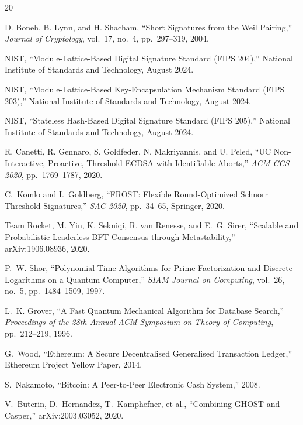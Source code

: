 \begin{thebibliography}{20}

D. Boneh, B. Lynn, and H. Shacham, ``Short Signatures from the Weil Pairing,''
\emph{Journal of Cryptology}, vol.~17, no.~4, pp.~297--319, 2004.

NIST, ``Module-Lattice-Based Digital Signature Standard (FIPS 204),''
National Institute of Standards and Technology, August 2024.

NIST, ``Module-Lattice-Based Key-Encapsulation Mechanism Standard (FIPS 203),''
National Institute of Standards and Technology, August 2024.

NIST, ``Stateless Hash-Based Digital Signature Standard (FIPS 205),''
National Institute of Standards and Technology, August 2024.

R. Canetti, R. Gennaro, S. Goldfeder, N. Makriyannis, and U. Peled, ``UC
Non-Interactive, Proactive, Threshold ECDSA with Identifiable Aborts,''
\emph{ACM CCS 2020}, pp.~1769--1787, 2020.

C.~Komlo and I.~Goldberg, ``FROST: Flexible Round-Optimized Schnorr Threshold
Signatures,'' \emph{SAC 2020}, pp.~34--65, Springer, 2020.

Team Rocket, M. Yin, K. Sekniqi, R. van Renesse, and E.~G. Sirer, ``Scalable and
Probabilistic Leaderless BFT Consensus through Metastability,'' arXiv:1906.08936, 2020.

P.~W. Shor, ``Polynomial-Time Algorithms for Prime Factorization and Discrete
Logarithms on a Quantum Computer,'' \emph{SIAM Journal on Computing}, vol.~26,
no.~5, pp.~1484--1509, 1997.

L.~K. Grover, ``A Fast Quantum Mechanical Algorithm for Database Search,''
\emph{Proceedings of the 28th Annual ACM Symposium on Theory of Computing},
pp.~212--219, 1996.

G.~Wood, ``Ethereum: A Secure Decentralised Generalised Transaction Ledger,''
Ethereum Project Yellow Paper, 2014.

S.~Nakamoto, ``Bitcoin: A Peer-to-Peer Electronic Cash System,'' 2008.

V.~Buterin, D.~Hernandez, T.~Kamphefner, et al., ``Combining GHOST and Casper,''
arXiv:2003.03052, 2020.


\end{thebibliography}
